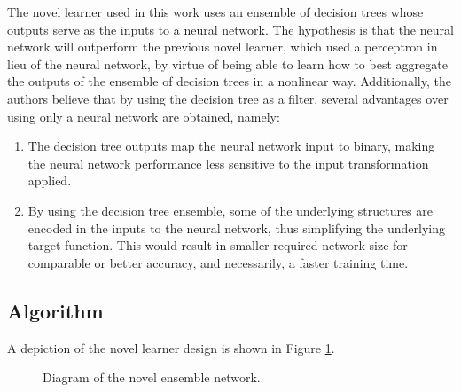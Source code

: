 \documentclass[paper=a4, fontsize=11pt]{scrartcl} %
\begin{document}
The novel learner used in this work uses an ensemble of decision trees whose outputs serve as the inputs to a neural network. 
The hypothesis is that the neural network will outperform the previous novel learner, which used a perceptron in lieu of the neural network, by virtue of being able to learn how to best aggregate the outputs of the ensemble of decision trees in a nonlinear way.
Additionally, the authors believe that by using the decision tree as a filter, several advantages over using only a neural network are obtained, namely:
\begin{enumerate}
	\item The decision tree outputs map the neural network input to binary, making the neural network performance less sensitive to the input transformation applied.
	\item By using the decision tree ensemble, some of the underlying structures are encoded in the inputs to the neural network, thus simplifying the underlying target function. This would result in smaller required network size for comparable or better accuracy, and necessarily, a faster training time.
\end{enumerate}


\subsection*{Algorithm}

A depiction of the novel learner design is shown in Figure \ref{fig: novel}.

\begin{figure}[H]
	\begin{center}
	\caption{Diagram of the novel ensemble network.}
	\label{fig: novel}
	\end{center}
\end{figure}
\end{document}
